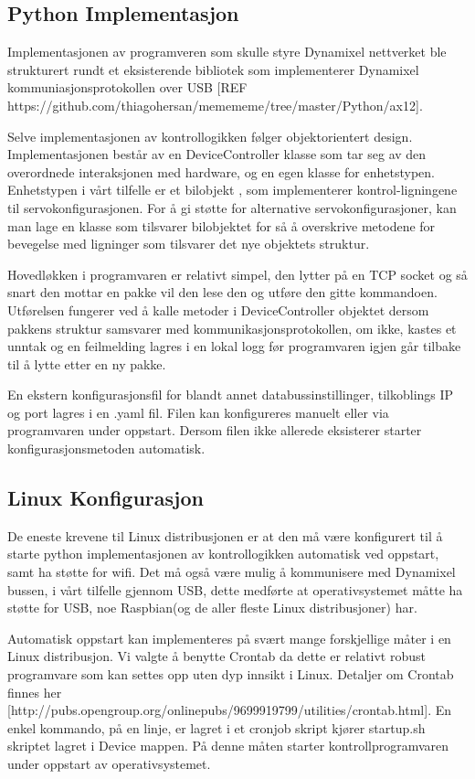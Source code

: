 \documentclass[12pt]{report}
\begin{document}
\subsection{Python Implementasjon}
Implementasjonen av programveren som skulle styre Dynamixel nettverket ble strukturert rundt et eksisterende bibliotek som implementerer Dynamixel kommuniasjonsprotokollen over USB [REF https://github.com/thiagohersan/memememe/tree/master/Python/ax12].

Selve implementasjonen av kontrollogikken følger objektorientert design. Implementasjonen består av en DeviceController klasse som tar seg av den overordnede interaksjonen med hardware, og en egen klasse for enhetstypen. Enhetstypen i vårt tilfelle er et bilobjekt , som implementerer kontrol-ligningene til servokonfigurasjonen. For å gi støtte for alternative servokonfigurasjoner, kan man lage en klasse som tilsvarer bilobjektet for så å overskrive metodene for bevegelse med ligninger som tilsvarer det nye objektets struktur.

Hovedløkken i programvaren er relativt simpel, den lytter på en TCP socket og så snart den mottar en pakke vil den lese den og utføre den gitte kommandoen. Utførelsen fungerer ved å kalle metoder i DeviceController objektet dersom pakkens struktur samsvarer med kommunikasjonsprotokollen, om ikke, kastes et unntak og en feilmelding lagres i en lokal logg før programvaren igjen går tilbake til å lytte etter en ny pakke.

En ekstern konfigurasjonsfil for blandt annet databussinstillinger, tilkoblings IP  og port lagres i en .yaml fil. Filen kan konfigureres manuelt eller via programvaren under oppstart. Dersom filen ikke allerede eksisterer starter konfigurasjonsmetoden automatisk.

\subsection{Linux Konfigurasjon}
De eneste krevene til Linux distribusjonen er at den må være konfigurert til å starte python implementasjonen av kontrollogikken automatisk ved oppstart, samt ha støtte for wifi. Det må også være mulig å kommunisere med Dynamixel bussen, i vårt tilfelle gjennom USB, dette medførte at operativsystemet måtte ha støtte for USB, noe Raspbian(og de aller fleste Linux distribusjoner) har.

Automatisk oppstart kan implementeres på svært mange forskjellige måter i en Linux distribusjon. Vi valgte å benytte Crontab da dette er relativt robust programvare som kan settes opp uten dyp innsikt i Linux. Detaljer om Crontab finnes her [http://pubs.opengroup.org/onlinepubs/9699919799/utilities/crontab.html]. En enkel kommando, på en linje, er lagret i et cronjob skript kjører startup.sh skriptet lagret i Device mappen. På denne måten starter kontrollprogramvaren under oppstart av operativsystemet.
\end{document}
